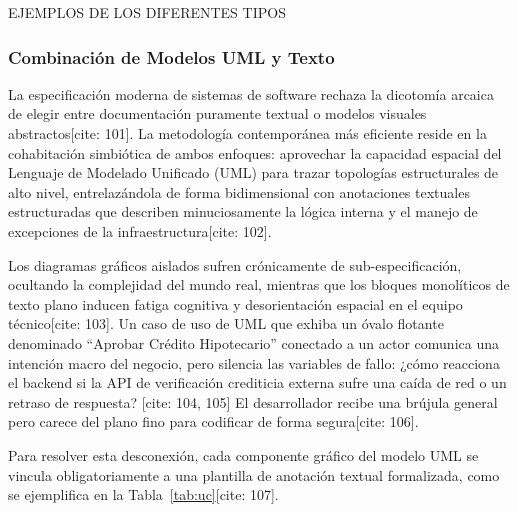 \documentclass[11pt,a4paper]{article}
\begin{document}
	EJEMPLOS DE LOS DIFERENTES TIPOS
	
	\subsubsection{Combinación de Modelos UML y Texto}
	La especificación moderna de sistemas de software rechaza la dicotomía arcaica de elegir entre documentación puramente textual o modelos visuales abstractos[cite: 101]. La metodología contemporánea más eficiente reside en la cohabitación simbiótica de ambos enfoques: aprovechar la capacidad espacial del Lenguaje de Modelado Unificado (UML) para trazar topologías estructurales de alto nivel, entrelazándola de forma bidimensional con anotaciones textuales estructuradas que describen minuciosamente la lógica interna y el manejo de excepciones de la infraestructura[cite: 102].
	
	Los diagramas gráficos aislados sufren crónicamente de sub-especificación, ocultando la complejidad del mundo real, mientras que los bloques monolíticos de texto plano inducen fatiga cognitiva y desorientación espacial en el equipo técnico[cite: 103]. Un caso de uso de UML que exhiba un óvalo flotante denominado ``Aprobar Crédito Hipotecario'' conectado a un actor comunica una intención macro del negocio, pero silencia las variables de fallo: ¿cómo reacciona el backend si la API de verificación crediticia externa sufre una caída de red o un retraso de respuesta? [cite: 104, 105] El desarrollador recibe una brújula general pero carece del plano fino para codificar de forma segura[cite: 106].
	
	Para resolver esta desconexión, cada componente gráfico del modelo UML se vincula obligatoriamente a una plantilla de anotación textual formalizada, como se ejemplifica en la Tabla~\ref{tab:uc}[cite: 107].
	
\end{document}

